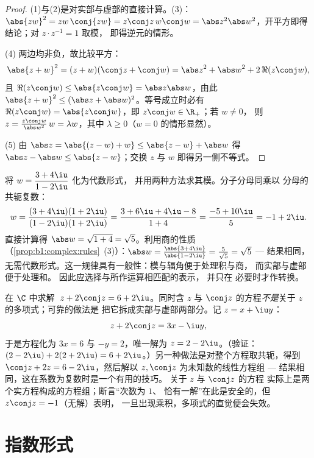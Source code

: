 \begin{proof}
(1)与(2)是对实部与虚部的直接计算。(3)：
$\abs{zw}^2 = zw\,\conj{zw} = z\conj z\, w \conj w = \abs z^2 \abs
w^2$，开平方即得结论；对 $z \cdot z^{-1} = 1$ 取模，
即得逆元的情形。

(4) 两边均非负，故比较平方：
\[
\abs{z+w}^2 = (z+w)(\conj z + \conj w)
= \abs z^2 + \abs w^2 + 2\,\Re(z \conj w),
\]
且 $\Re(z\conj w) \leq \abs{z \conj w} = \abs z \abs w$，由此
$\abs{z+w}^2 \leq (\abs z + \abs w)^2$。等号成立时必有 $\Re(z \conj
w) = \abs{z \conj w}$，即 $z \conj w \in \R_+$；若 $w \neq 0$，
则 $z = \frac{z\conj w}{\abs w^2}\, w = \lambda w$，其中 $\lambda
\geq 0$（$w = 0$ 的情形显然）。

(5) 由 $\abs z = \abs{(z - w) + w} \leq \abs{z-w} + \abs w$ 得 $\abs z
- \abs w \leq \abs{z - w}$；交换 $z$ 与 $w$ 即得另一侧不等式。
\end{proof}

\begin{example}[模与辐角的完整演算]\label{ex:b1:complex:workout}
将 $w = \dfrac{3 + 4\iu}{1 - 2\iu}$ 化为代数形式，
并用两种方法求其模。分子分母同乘以
分母的共轭复数：
\[
w = \frac{(3 + 4\iu)(1 + 2\iu)}{(1 - 2\iu)(1 + 2\iu)}
= \frac{3 + 6\iu + 4\iu - 8}{1 + 4}
= \frac{-5 + 10\iu}{5} = -1 + 2\iu .
\]
直接计算得 $\abs w = \sqrt{1 + 4} = \sqrt5$。利用商的性质
（\cref{prop:b1:complex:rules}~(3)）：$\abs w = \frac{\abs{3 +
4\iu}}{\abs{1 - 2\iu}} = \frac5{\sqrt5} = \sqrt5$ --- 结果相同，
无需代数形式。这一规律具有一般性：模与辐角便于处理积与商，
而实部与虚部便于处理和。
因此应选择与所作运算相匹配的表示，
并只在
必要时才作转换。
\end{example}

\begin{example}[涉及共轭复数的方程]\label{ex:b1:complex:conjeq}
在 $\C$ 中求解 $\;z + 2\conj z = 6 + 2\iu$。同时含 $z$ 与
$\conj z$ 的方程\emph{不是}关于 $z$ 的多项式；可靠的做法是
把它拆成实部与虚部两部分。记 $z = x + \iu y$：
\[
z + 2\conj z = 3x - \iu y ,
\]
于是方程化为 $3x = 6$ 与 $-y = 2$，唯一解为
$z = 2 - 2\iu$。（验证：$(2 - 2\iu) + 2(2 + 2\iu) = 6 +
2\iu$。）另一种做法是对整个方程取共轭，得到
$\conj z + 2z = 6 - 2\iu$，然后解以
$z, \conj z$ 为未知数的线性方程组 --- 结果相同，这在系数为复数时是一个有用的技巧。
关于 $z$ 与 $\conj z$ 的方程
实际上是两个实方程构成的方程组；断言“次数为 $1$、
恰有一解”在此是安全的，但 $z\conj z = -1$（无解）表明，
一旦出现乘积，多项式的直觉便会失效。
\end{example}

\section{指数形式}

